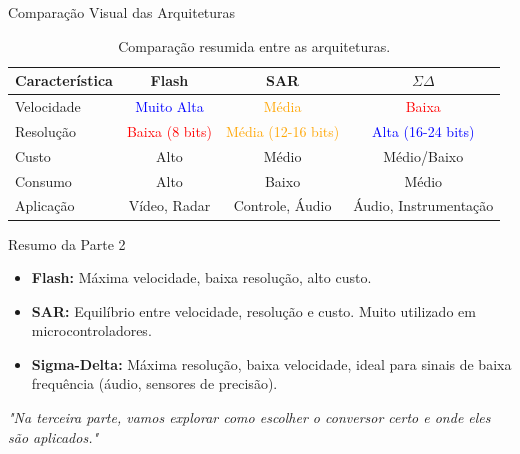 \documentclass{beamer}
\begin{document}
\begin{frame}{Comparação Visual das Arquiteturas}
    \begin{table}
        \centering
        \footnotesize %
        \setlength{\tabcolsep}{4pt} %
        \begin{tabular}{lccc}
            \toprule
            \textbf{Característica} & \textbf{Flash} & \textbf{SAR} & \textbf{$\Sigma\Delta$} \\
            \midrule
            Velocidade & \textcolor{blue}{Muito Alta} & \textcolor{orange}{Média} & \textcolor{red}{Baixa} \\
            Resolução & \textcolor{red}{Baixa (8 bits)} & \textcolor{orange}{Média (12-16 bits)} & \textcolor{blue}{Alta (16-24 bits)} \\
            Custo & Alto & Médio & Médio/Baixo \\
            Consumo & Alto & Baixo & Médio \\
            Aplicação & Vídeo, Radar & Controle, Áudio & Áudio, Instrumentação \\
            \bottomrule
        \end{tabular}
        \caption{Comparação resumida entre as arquiteturas.}
    \end{table}
\end{frame}

\begin{frame}{Resumo da Parte 2}
    \begin{itemize}
        \item \textbf{Flash:} Máxima velocidade, baixa resolução, alto custo.
        \item \textbf{SAR:} Equilíbrio entre velocidade, resolução e custo. Muito utilizado em microcontroladores.
        \item \textbf{Sigma-Delta:} Máxima resolução, baixa velocidade, ideal para sinais de baixa frequência (áudio, sensores de precisão).
    \end{itemize}
    \vspace{0.5cm}
    \begin{center}
        \textit{"Na terceira parte, vamos explorar como escolher o conversor certo e onde eles são aplicados."}
    \end{center}
\end{frame}

\end{document}
